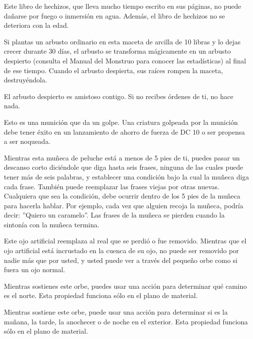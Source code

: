 \documentclass[a4paper,twocolumn,openany,10pt]{dndbook}
\begin{document}
Este libro de hechizos, que lleva mucho tiempo escrito en sus páginas, no puede dañarse por fuego o inmersión en agua. Además,
el libro de hechizos no se deteriora con la edad.

Si plantas un arbusto ordinario en esta maceta de arcilla de 10 libras y lo dejas crecer durante 30 días, el arbusto se
transforma mágicamente en un arbusto despierto (consulta el Manual del Monstruo para conocer las estadísticas) al final de ese
tiempo. Cuando el arbusto despierta, sus raíces rompen la maceta, destruyéndola.

El arbusto despierto es amistoso contigo. Si no recibes órdenes de ti, no hace nada. 

Esto es una munición que da un golpe. Una criatura golpeada por la munición debe tener éxito en un lanzamiento de ahorro de
fuerza de DC 10 o ser propensa a ser noqueada. 

Mientras esta muñeca de peluche está a menos de 5 pies de ti, puedes pasar un descanso corto diciéndole que diga hasta seis
frases, ninguna de las cuales puede tener más de seis palabras, y establecer una condición bajo la cual la muñeca diga cada
frase. También puede reemplazar las frases viejas por otras nuevas. Cualquiera que sea la condición, debe ocurrir dentro de los
5 pies de la muñeca para hacerla hablar. Por ejemplo, cada vez que alguien recoja la muñeca, podría decir: ''Quiero un caramelo''.
Las frases de la muñeca se pierden cuando la sintonía con la muñeca termina. 

Este ojo artificial reemplaza al real que se perdió o fue removido. Mientras que el ojo artificial está incrustado en la cuenca
de su ojo, no puede ser removido por nadie más que por usted, y usted puede ver a través del pequeño orbe como si fuera un ojo
normal. 

Mientras sostienes este orbe, puedes usar una acción para determinar qué camino es el norte. Esta propiedad funciona sólo en el
plano de material.

Mientras sostiene este orbe, puede usar una acción para determinar si es la mañana, la tarde, la anochecer o de noche en el
exterior. Esta propiedad funciona sólo en el plano de material.
\end{document}
